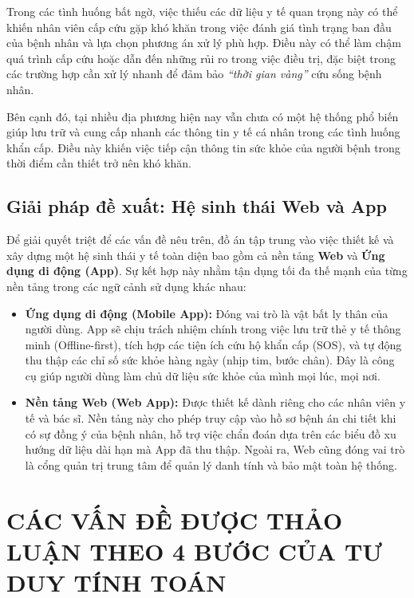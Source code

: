 \documentclass[a4paper,12pt]{article}
\begin{document}
Trong các tình huống bất ngờ, việc thiếu các dữ liệu y tế quan trọng này có thể khiến nhân
viên cấp cứu gặp khó khăn trong việc đánh giá tình trạng ban đầu của bệnh nhân và lựa
chọn phương án xử lý phù hợp. Điều này có thể làm chậm quá trình cấp cứu hoặc dẫn đến
những rủi ro trong việc điều trị, đặc biệt trong các trường hợp cần xử lý nhanh để đảm bảo
\textit{``thời gian vàng''} cứu sống bệnh nhân.

Bên cạnh đó, tại nhiều địa phương hiện nay vẫn chưa có một hệ thống phổ biến giúp lưu
trữ và cung cấp nhanh các thông tin y tế cá nhân trong các tình huống khẩn cấp. Điều này
khiến việc tiếp cận thông tin sức khỏe của người bệnh trong thời điểm cần thiết trở nên khó
khăn.

\subsection{Giải pháp đề xuất: Hệ sinh thái Web và App}

Để giải quyết triệt để các vấn đề nêu trên, đồ án tập trung vào việc thiết kế và xây dựng một hệ sinh thái y tế toàn diện bao gồm cả nền tảng \textbf{Web} và \textbf{Ứng dụng di động (App)}. Sự kết hợp này nhằm tận dụng tối đa thế mạnh của từng nền tảng trong các ngữ cảnh sử dụng khác nhau:

\begin{itemize}
    \item \textbf{Ứng dụng di động (Mobile App):} Đóng vai trò là vật bất ly thân của người dùng. App sẽ chịu trách nhiệm chính trong việc lưu trữ thẻ y tế thông minh (Offline-first), tích hợp các tiện ích cứu hộ khẩn cấp (SOS), và tự động thu thập các chỉ số sức khỏe hàng ngày (nhịp tim, bước chân). Đây là công cụ giúp người dùng làm chủ dữ liệu sức khỏe của mình mọi lúc, mọi nơi.
    
    \item \textbf{Nền tảng Web (Web App):} Được thiết kế dành riêng cho các nhân viên y tế và bác sĩ. Nền tảng này cho phép truy cập vào hồ sơ bệnh án chi tiết khi có sự đồng ý của bệnh nhân, hỗ trợ việc chẩn đoán dựa trên các biểu đồ xu hướng dữ liệu dài hạn mà App đã thu thập. Ngoài ra, Web cũng đóng vai trò là cổng quản trị trung tâm để quản lý danh tính và bảo mật toàn hệ thống.
\end{itemize}

\section{CÁC VẤN ĐỀ ĐƯỢC THẢO LUẬN THEO 4 BƯỚC CỦA TƯ DUY TÍNH TOÁN}
\end{document}
